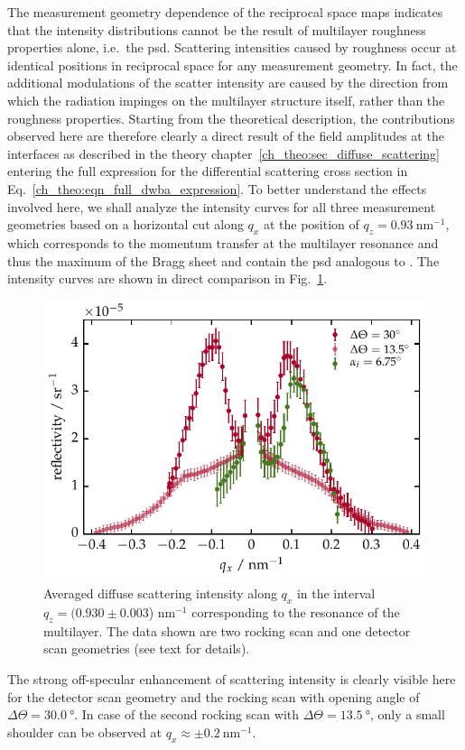 The measurement geometry dependence of the reciprocal space maps indicates that the intensity distributions cannot be the result of multilayer roughness properties alone, i.e.~the \gls{psd}. Scattering intensities caused by roughness occur at identical positions in reciprocal space for any measurement geometry. In fact, the additional modulations of the scatter intensity are caused by the direction from which the radiation impinges on the multilayer structure itself, rather than the roughness properties. Starting from the theoretical description, the contributions observed here are therefore clearly a direct result of the field amplitudes at the interfaces as described in the theory chapter~\ref{ch_theo:sec_diffuse_scattering} entering the full expression for the differential scattering cross section in Eq.~\eqref{ch_theo:eqn_full_dwba_expression}. To better understand the effects involved here, we shall analyze the intensity curves for all three measurement geometries based on a horizontal cut along $q_x$ at the position of $q_z=\SI{0.93}{\nano\meter^{-1}}$, which corresponds to the momentum transfer at the multilayer resonance and thus the maximum of the Bragg sheet and contain the \gls{psd} analogous to \textcite{siffalovic_characterization_2009}. The intensity curves are shown in direct comparison in Fig.~\ref{ch_diff:fig_PTB17_qx_cuts_different_geometries}.
\begin{figure}[htbp]
	\includegraphics{img/PTB17_diffuse_BraggSheet_DetectorAndRocking} \caption{Averaged diffuse scattering intensity along $q_x$ in the interval  $q_z=(0.930 \pm 0.003$) nm$^{-1}$ corresponding to the resonance of the multilayer. The data shown are two rocking scan and one detector scan geometries (see text for details).} \label{ch_diff:fig_PTB17_qx_cuts_different_geometries}
\end{figure}
The strong off-specular enhancement of scattering intensity is clearly visible here for the detector scan geometry and the rocking scan with opening angle of $\Delta\Theta = \SI{30.0}{\degree}$. In case of the second rocking scan with $\Delta\Theta = \SI{13.5}{\degree}$, only a small shoulder can be observed at $q_x \approx \pm \SI{0.2}{\nano\meter^{-1}}$.

